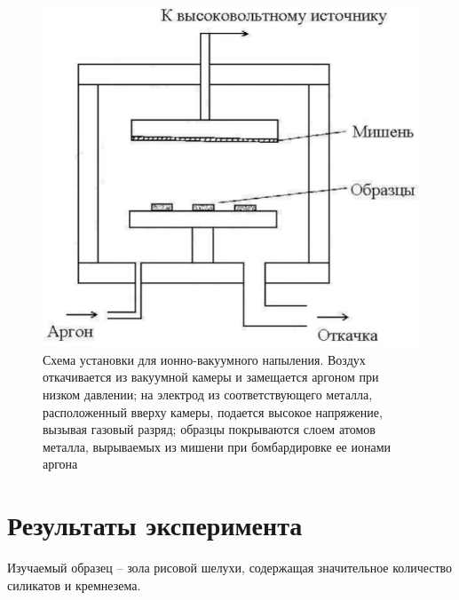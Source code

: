 \documentclass[12pt]{article}
\begin{document}
\begin{figure}[!ht]
\centering
\includegraphics[scale = 0.4]{pictures/ionic.png}
\caption{Схема установки для ионно-вакуумного напыления. Воздух откачивается из вакуумной камеры и замещается аргоном при низком давлении; на электрод из соответствующего металла, расположенный вверху камеры, подается высокое напряжение, вызывая газовый разряд; образцы покрываются слоем атомов металла, вырываемых из мишени при бомбардировке ее ионами аргона}
\end{figure}

\section*{Результаты эксперимента}

Изучаемый образец -- зола рисовой шелухи, содержащая значительное количество силикатов и кремнезема. 
\end{document}

